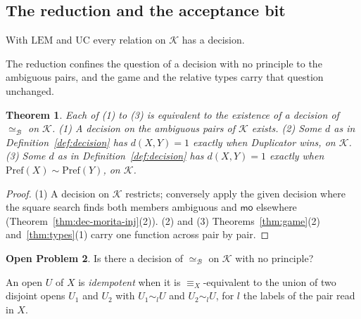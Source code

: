 \documentclass{lmcs}
\newtheorem{theorem}{Theorem}[section]
\theoremstyle{definition}
\newtheorem{openproblem}[theorem]{Open Problem}
\theoremstyle{remark}
\newcommand{\prin}[1]{\mathrm{#1}}
\newcommand{\EM}{\prin{LEM}}
\newcommand{\UC}{\prin{UC}}
\newcommand{\Pref}{\mathrm{Pref}}
\newcommand{\feq}[1]{\equiv_{#1}}
\providecommand{\moB}{\mathsf{mo}}
\providecommand{\tyl}[1]{\sim_{#1}}
\providecommand{\tyeq}{\sim}
\providecommand{\Cls}{\mathcal{K}}
\providecommand{\eqB}{\simeq_{\mathcal{B}}}
\begin{document}
\subsection{The reduction and the acceptance bit}\label{ssec:decide-reduce}

With $\EM$ and $\UC$ every relation on $\Cls$ has a decision.

The reduction confines the question of a decision with no principle to the ambiguous pairs, and the game and the
relative types carry that question unchanged.

\begin{theorem}\label{thm:decide}
Each of (1) to (3) is equivalent to the existence of a decision of $\eqB$ on $\Cls$.
(1) A decision on the ambiguous pairs of $\Cls$ exists. (2) Some $d$ as in
Definition~\ref{def:decision} has $d(X,Y)=1$ exactly when Duplicator wins, on $\Cls$.
(3) Some $d$ as in Definition~\ref{def:decision} has $d(X,Y)=1$ exactly when $\Pref(X)\tyeq\Pref(Y)$, on
$\Cls$.
\end{theorem}

\begin{proof}
(1) A decision on $\Cls$ restricts; conversely apply the given decision where the square search finds both members
ambiguous and $\moB$ elsewhere (Theorem~\ref{thm:dec-morita-inj}(2)). (2) and
(3) Theorems~\ref{thm:game}(2) and~\ref{thm:types}(1) carry one function across pair by pair.
\end{proof}

\begin{openproblem}\label{oprob:decide}
Is there a decision of $\eqB$ on $\Cls$ with no principle?
\end{openproblem}

An open $U$ of $X$ is \emph{idempotent} when it is $\feq{X}$-equivalent to the union of two disjoint opens $U_1$ and
$U_2$ with $U_1\tyl{l}U$ and $U_2\tyl{l}U$, for $l$ the labels of the pair read in $X$.
\end{document}
